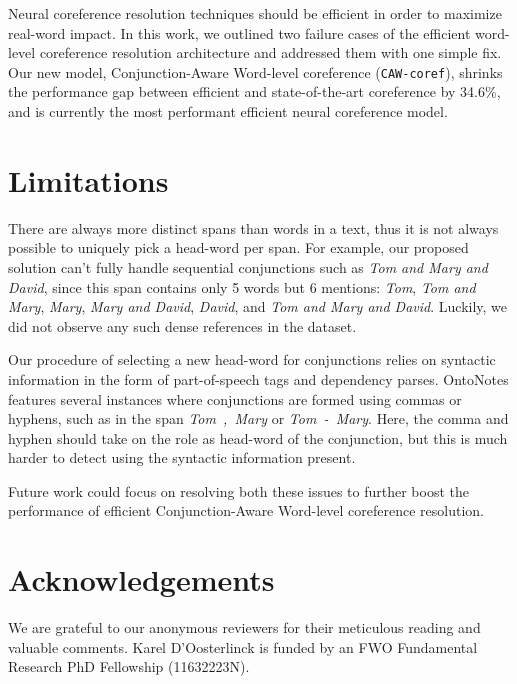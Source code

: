 \documentclass[11pt]{article}
\newcommand\cawcoref{{\texttt{CAW-coref}}}
\begin{document}
Neural coreference resolution techniques should be efficient in order to maximize real-word impact. In this work, we outlined two failure cases of the efficient word-level coreference resolution architecture and addressed them with one simple fix. Our new model, Conjunction-Aware Word-level coreference (\cawcoref{}), shrinks the performance gap between efficient and state-of-the-art coreference by 34.6\%, and is currently the most performant efficient neural coreference model.






\clearpage





\clearpage



\section*{Limitations}
There are always more distinct spans than words in a text, thus it is not always possible to uniquely pick a head-word per span. For example, our proposed solution can't fully handle sequential conjunctions such as \emph{Tom and Mary and David}, since this span contains only 5 words but 6 mentions: \emph{Tom}, \emph{Tom and Mary}, \emph{Mary}, \emph{Mary and David}, \emph{David}, and \emph{Tom and Mary and David}. Luckily, we did not observe any such dense references in the dataset.

Our procedure of selecting a new head-word for conjunctions relies on syntactic information in the form of part-of-speech tags and dependency parses. OntoNotes features several instances where conjunctions are formed using commas or hyphens, such as in the span \emph{Tom~,~Mary} or \emph{Tom~-~Mary}. Here, the comma and hyphen should take on the role as head-word of the conjunction, but this is much harder to detect using the syntactic information present.

Future work could focus on resolving both these issues to further boost the performance of efficient Conjunction-Aware Word-level coreference resolution.



\section*{Acknowledgements}
We are grateful to our anonymous reviewers for their meticulous reading and valuable comments. Karel D'Oosterlinck is funded by an FWO Fundamental Research PhD Fellowship (11632223N).
\end{document}
